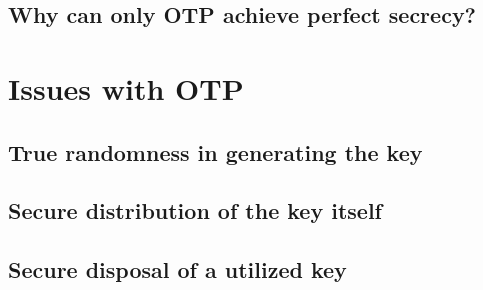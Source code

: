 \documentclass[12pt]{report}
\begin{document}
\subsection{Why can only OTP achieve perfect secrecy?}

\section{Issues with OTP}

\subsection{True randomness in generating the key}

\subsection{Secure distribution of the key itself}

\subsection{Secure disposal of a utilized key}


\printbibliography
\end{document}
